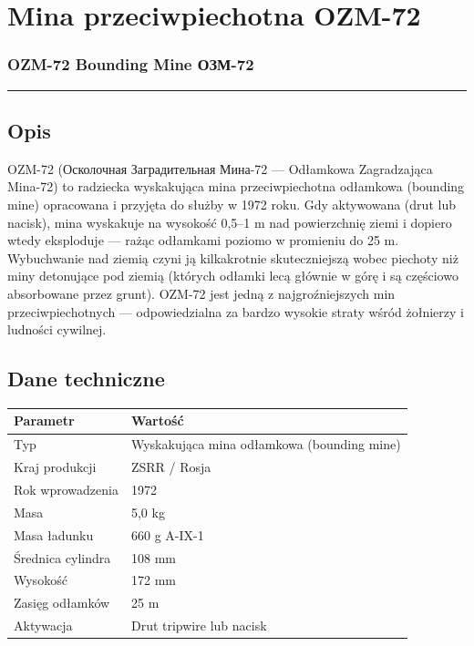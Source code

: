 \documentclass[12pt,openany,oneside]{book}
\begin{document}
\chapter{Mina przeciwpiechotna
OZM-72}\label{mina-przeciwpiechotna-ozm-72}

\subsection{OZM-72 Bounding Mine \textbar{}
ОЗМ-72}\label{ozm-72-bounding-mine-ux43eux437ux43c-72}

\begin{center}\rule{0.5\linewidth}{0.5pt}\end{center}

\section{Opis}\label{opis-109}

OZM-72 (Осколочная Заградительная Мина-72 --- Odłamkowa Zagradzająca
Mina-72) to radziecka wyskakująca mina przeciwpiechotna odłamkowa
(bounding mine) opracowana i przyjęta do służby w 1972 roku. Gdy
aktywowana (drut lub nacisk), mina wyskakuje na wysokość 0,5--1 m nad
powierzchnię ziemi i dopiero wtedy eksploduje --- rażąc odłamkami
poziomo w promieniu do 25 m. Wybuchwanie nad ziemią czyni ją
kilkakrotnie skuteczniejszą wobec piechoty niż miny detonujące pod
ziemią (których odłamki lecą głównie w górę i są częściowo absorbowane
przez grunt). OZM-72 jest jedną z najgroźniejszych min
przeciwpiechotnych --- odpowiedzialna za bardzo wysokie straty wśród
żołnierzy i ludności cywilnej.

\section{Dane techniczne}\label{dane-techniczne-109}

\begin{longtable}[]{@{}ll@{}}
\toprule\noalign{}
Parametr & Wartość \\
\midrule\noalign{}
\endhead
\bottomrule\noalign{}
\endlastfoot
Typ & Wyskakująca mina odłamkowa (bounding mine) \\
Kraj produkcji & ZSRR / Rosja \\
Rok wprowadzenia & 1972 \\
Masa & 5,0 kg \\
Masa ładunku & 660 g A-IX-1 \\
Średnica cylindra & 108 mm \\
Wysokość & 172 mm \\
Zasięg odłamków & 25 m \\
Aktywacja & Drut tripwire lub nacisk \\
\end{longtable}
\end{document}
